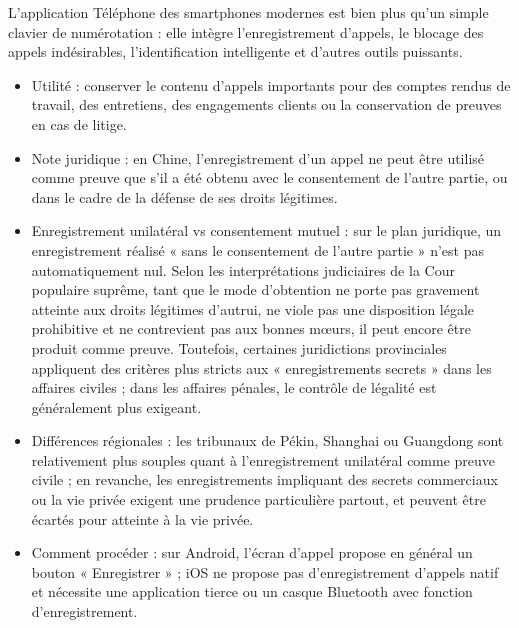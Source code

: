 


L'application Téléphone des smartphones modernes est bien plus qu'un simple clavier de numérotation : elle intègre l'enregistrement d'appels, le blocage des appels indésirables, l'identification intelligente et d'autres outils puissants.


\begin{itemize}
  \item Utilité : conserver le contenu d'appels importants pour des comptes rendus de travail, des entretiens, des engagements clients ou la conservation de preuves en cas de litige.
  \item Note juridique : en Chine, l'enregistrement d'un appel ne peut être utilisé comme preuve que s'il a été obtenu avec le consentement de l'autre partie, ou dans le cadre de la défense de ses droits légitimes.
  \item Enregistrement unilatéral vs consentement mutuel : sur le plan juridique, un enregistrement réalisé « sans le consentement de l'autre partie » n'est pas automatiquement nul. Selon les interprétations judiciaires de la Cour populaire suprême, tant que le mode d'obtention ne porte pas gravement atteinte aux droits légitimes d'autrui, ne viole pas une disposition légale prohibitive et ne contrevient pas aux bonnes mœurs, il peut encore être produit comme preuve. Toutefois, certaines juridictions provinciales appliquent des critères plus stricts aux « enregistrements secrets » dans les affaires civiles ; dans les affaires pénales, le contrôle de légalité est généralement plus exigeant.
  \item Différences régionales : les tribunaux de Pékin, Shanghai ou Guangdong sont relativement plus souples quant à l'enregistrement unilatéral comme preuve civile ; en revanche, les enregistrements impliquant des secrets commerciaux ou la vie privée exigent une prudence particulière partout, et peuvent être écartés pour atteinte à la vie privée.
  \item Comment procéder : sur Android, l'écran d'appel propose en général un bouton « Enregistrer » ; iOS ne propose pas d'enregistrement d'appels natif et nécessite une application tierce ou un casque Bluetooth avec fonction d'enregistrement.
\end{itemize}

